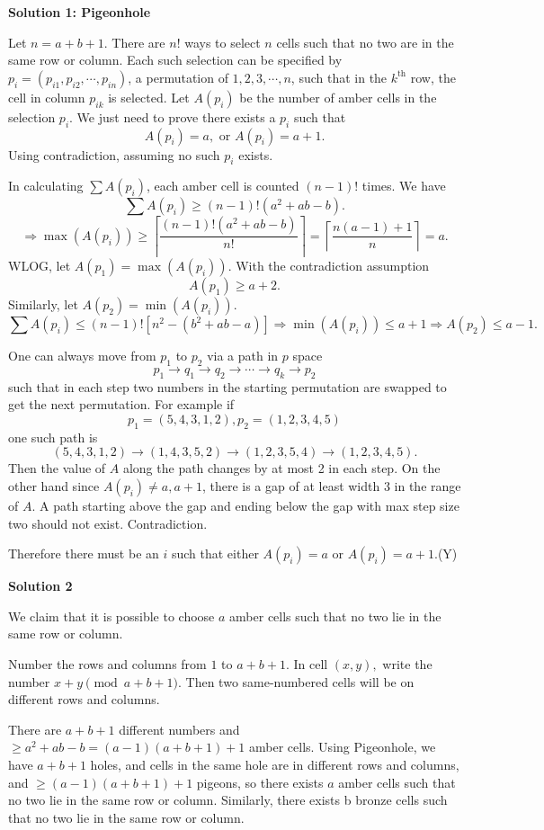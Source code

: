 \begin{enumerate}
 



\textbf{Solution 1: Pigeonhole}

Let $n=a+b+1$. There are $n!$ ways to select $n$ cells such that no two are in the same row or column. Each such selection can be specified by $p_i=(p_{i1},p_{i2},\cdots,p_{in})$, a permutation of $1,2,3,\cdots,n$, such that in the $k^\text{th}$ row, the cell in column $p_{ik}$ is selected. Let $A(p_i)$ be the number of amber cells in the selection $p_i$. We just need to prove there exists a $p_i$ such that
 \[A(p_i)=a,\text{ or } A(p_i)=a+1.\]Using contradiction, assuming no such $p_i$ exists.

 In calculating $\sum A(p_i)$, each amber cell is counted $(n-1)!$ times. We have
 \[\sum A(p_i) \ge (n-1)!(a^2+ab-b).\]
 \[\Rightarrow\max(A(p_i))\ge\left\lceil\frac{(n-1)!(a^2+ab-b)}{n!}\right\rceil=\left\lceil\frac{n(a-1)+1}{n}\right\rceil = a.\]WLOG, let $A(p_1)=\max(A(p_i))$. With the contradiction assumption
 \[A(p_1)\ge a+2.\]Similarly, let $A(p_2)=\min(A(p_i))$.
 \[\sum A(p_i) \le (n-1)![n^2-(b^2+ab-a)] \Rightarrow \min(A(p_i))\le a+1 \Rightarrow A(p_2)\le a-1.\]

 One can always move from $p_1$ to $p_2$ via a path in $p$ space
 \[p_1\rightarrow q_1 \rightarrow q_2 \rightarrow \cdots \rightarrow q_k \rightarrow p_2\]such that in each step two numbers in the starting permutation are swapped to get the next permutation. For example if
 \[p_1=(5,4,3,1,2), p_2=(1,2,3,4,5)\]one such path is 
 \[(5,4,3,1,2)\rightarrow (1,4,3,5,2) \rightarrow (1,2,3,5,4) \rightarrow (1,2,3,4,5).\]Then the value of $A$ along the path changes by at most 2 in each step. On the other hand since $A(p_i)\neq a, a+1$, there is a gap of at least width 3 in the range of $A$. A path starting above the gap and ending below the gap with max step size two should not exist. Contradiction. 

 Therefore there must be an $i$ such that either $A(p_i)=a$ or $A(p_i)=a+1$.(Y)

 



\textbf{Solution 2}

We claim that it is possible to choose $a$ amber cells such that no two lie in the same row or column.

 Number the rows and columns from $1$ to $a+b+1.$ In cell $(x,y),$ write the number $x+y\pmod{a+b+1}.$  Then two same-numbered cells will be on different rows and columns.

 There are $a+b+1$ different numbers and $\geq a^2+ab-b = (a-1)(a+b+1)+1$ amber cells. Using Pigeonhole, we have $a+b+1$ holes, and cells in the same hole are in different rows and columns, and $\geq(a-1)(a+b+1)+1$ pigeons, so there exists $a$ amber cells such that no two lie in the same row or column. Similarly, there exists b bronze cells such that no two lie in the same row or column.


\end{enumerate}
